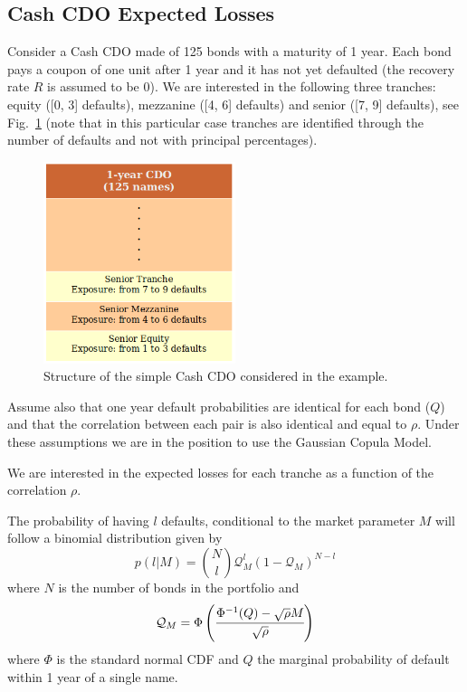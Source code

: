 \subsection{Cash CDO Expected Losses}
\label{sec:expected_losses}

Consider a Cash CDO made of 125 bonds with a maturity of 1 year. Each bond pays a coupon of one unit after 1 year and it has not yet defaulted (the recovery rate $R$ is assumed to be 0). We are interested in the following three tranches: equity ([0, 3] defaults), mezzanine ([4, 6] defaults) and senior ([7, 9] defaults), see Fig.~\ref{fig:cdo_ex_1} (note that in this particular case tranches are identified through the number of defaults and not with principal percentages). 

\begin{figure}[htb]
	\centering
	\includegraphics[width=0.5\textwidth]{figures/ex_cdo_1}
	\caption{Structure of the simple Cash CDO considered in the example.}
	\label{fig:cdo_ex_1}
\end{figure}

Assume also that one year default probabilities are identical for each bond ($Q$) and that the correlation between each pair is also identical and equal to $\rho$. Under these assumptions we are in the position to use the Gaussian Copula Model. 

We are interested in the expected losses for each tranche as a function of the correlation $\rho$.

The probability of having $l$ defaults, conditional to the market parameter $M$ will follow a binomial distribution given by
\begin{equation}
p(l|M) = \binom{N}{l}\mathcal{Q}_M^l (1-\mathcal{Q}_M)^{N-l}
\label{eq:def_prob_ex_cdo_1}
\end{equation}
where $N$ is the number of bonds in the portfolio and 
\begin{equation}
\mathcal{Q}_M = \Phi\left(\cfrac{\Phi^{-1}(Q)-\sqrt{\rho}M}{\sqrt{\-\rho}}\right)
\end{equation}
where $\Phi$ is the standard normal CDF and $Q$ the marginal probability of default within 1 year of a single name.

